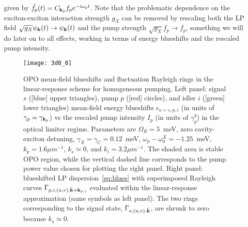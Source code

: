 given by $\tilde{f}_p(t)= C_{\mathbf{k}_p} f_p e^{-i\omega_p t}$. Note
that the problematic dependence on the exciton-exciton interaction
strength $g_X$ can be removed by rescaling both the LP field
$\sqrt{g_X}\psi_{\bm{k}}(t) \rightarrow \psi_{\bm{k}}(t)$ and the pump
strength $\sqrt{g_X}f_p \rightarrow f_p$, something we will do later
on to all effects, working in terms of energy blueshifts and the
rescaled pump intensity.
%
\begin{figure}[tb]
\centering
\texttt{[image: 3d0\_0]} %
\caption{OPO mean-field blueshifts and fluctuation
  Rayleigh rings in the linear-response scheme for homogeneous
  pumping. Left panel: signal $s$ ([blue] upper triangles), pump $p$
  ([red] circles), and idler $i$ ([green] lower triangles) mean-field
  energy blueshifts $\epsilon_{n=s,p,i}$ (in units of $\gamma_p =
  \gamma_{\mathbf{k}_p}$) vs the rescaled pump intensity $I_p$ (in
  units of $\gamma_p^3$) in the optical limiter regime. Parameters are
  $\Omega_R=5$~meV, zero cavity-exciton detuning, $\gamma_X = \gamma_C
  = 0.12$~meV, $\omega_p - \omega_0^X = -1.25$~meV, $k_p=1.6{\mu
    m}^{-1}$, $k_s \simeq 0$, and $k_i=3.2{\mu m}^{-1}$.  The shaded
  area is stable OPO region, while the vertical dashed line
  corresponds to the pump power value chosen for plotting the right
  panel. Right panel: blueshifted LP dispersion~\eqref{eq:blues} with
  superimposed Rayleigh curves $\Gamma_{p,i,(u,v), \tilde{\mathbf{k}} +
    \mathbf{k}_{p, i}}$ evaluated within the linear-response
  approximation (same symbols as left panel). The two rings
  corresponding to the signal state, $\Gamma_{s,(u,v),
    \tilde{\mathbf{k}}}$, are shrunk to zero because $k_s \simeq 0$.}
\label{fig:spect}
\end{figure}
%


